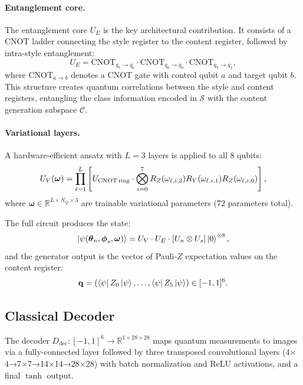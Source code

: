 \documentclass[twocolumn]{article}
\begin{document}
\paragraph{Entanglement core.}
The entanglement core $U_E$ is the key architectural contribution. It consists
of a CNOT ladder connecting the style register to the content register,
followed by intra-style entanglement:
\begin{equation}
  U_E = \text{CNOT}_{q_7 \to q_6} \cdot \text{CNOT}_{q_6 \to q_0} \cdot \text{CNOT}_{q_7 \to q_1},
  \label{eq:entcore}
\end{equation}
where CNOT$_{a \to b}$ denotes a CNOT gate with control qubit $a$ and target
qubit $b$. This structure creates quantum correlations between the style and
content registers, entangling the class information encoded in $\mathcal{S}$
with the content generation subspace $\mathcal{C}$.

\paragraph{Variational layers.}
A hardware-efficient ansatz \cite{kandala2017hardware} with $L = 3$ layers
is applied to all 8 qubits:
\begin{equation}
  U_V(\boldsymbol{\omega}) = \prod_{\ell=1}^{L}
    \left[ U_\text{CNOT\,ring} \cdot \bigotimes_{i=0}^{7}
    R_Z(\omega_{\ell,i,2}) R_Y(\omega_{\ell,i,1}) R_Z(\omega_{\ell,i,0}) \right],
\end{equation}
where $\boldsymbol{\omega} \in \mathbb{R}^{L \times N_Q \times 3}$ are
trainable variational parameters ($72$ parameters total).

The full circuit produces the state:
\begin{equation}
  \ket{\psi(\boldsymbol{\theta}_n, \boldsymbol{\phi}_s, \boldsymbol{\omega})} =
    U_V \cdot U_E \cdot [U_n \otimes U_s] \ket{0}^{\otimes 8},
\end{equation}
and the generator output is the vector of Pauli-$Z$ expectation values on the
content register:
\begin{equation}
  \mathbf{q} = (\bra{\psi} Z_0 \ket{\psi}, \ldots, \bra{\psi} Z_5 \ket{\psi})
    \in [-1, 1]^6.
\end{equation}

\subsection{Classical Decoder}
The decoder $D_\text{dec}: [-1,1]^6 \rightarrow \mathbb{R}^{1\times 28\times 28}$
maps quantum measurements to images via a fully-connected layer followed by
three transposed convolutional layers (4$\times$4→7$\times$7→14$\times$14→28$\times$28)
with batch normalization and ReLU activations, and a final $\tanh$ output.
\end{document}
